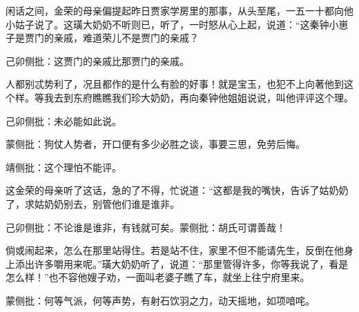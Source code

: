 \begin{parag}
    闲话之间，金荣的母亲偏提起昨日贾家学房里的那事，从头至尾，一五一十都向他小姑子说了。这璜大奶奶不听则已，听了，一时怒从心上起，说道：“这秦钟小崽子是贾门的亲戚，难道荣儿不是贾门的亲戚？\begin{note}己卯侧批：这贾门的亲戚比那贾门的亲戚。\end{note}人都别忒势利了，况且都作的是什么有脸的好事！就是宝玉，也犯不上向著他到这个样。等我去到东府瞧瞧我们珍大奶奶，再向秦钟他姐姐说说，叫他评评这个理。\begin{note}己卯侧批：未必能如此说。\end{note}\begin{note}蒙侧批：狗仗人势者，开口便有多少必胜之谈，事要三思，免劳后悔。\end{note}\begin{note}靖侧批：这个理怕不能评。\end{note}这金荣的母亲听了这话，急的了不得，忙说道：“这都是我的嘴快，告诉了姑奶奶了，求姑奶奶别去，别管他们谁是谁非。\begin{note}己卯侧批：不论谁是谁非，有钱就可矣。蒙侧批：胡氏可谓善哉！\end{note}倘或闹起来，怎么在那里站得住。若是站不住，家里不但不能请先生，反倒在他身上添出许多嚼用来呢。”璜大奶奶听了，说道：“那里管得许多，你等我说了，看是怎么样！”也不容他嫂子劝，一面叫老婆子瞧了车，就坐上往宁府里来。\begin{note}蒙侧批：何等气派，何等声势，有射石饮羽之力，动天摇地，如项喑咤。\end{note}
\end{parag}


